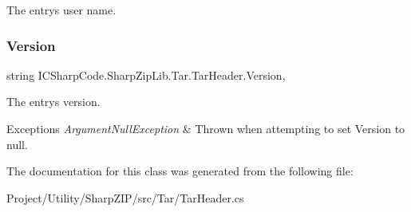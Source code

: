 The entry\textquotesingle{}s user name. 

\mbox{\label{class_i_c_sharp_code_1_1_sharp_zip_lib_1_1_tar_1_1_tar_header_a1c4dc61a04e28e9073cfea713e130d0c}} 
\subsubsection{\texorpdfstring{Version}{Version}}
{\footnotesize\ttfamily string I\+C\+Sharp\+Code.\+Sharp\+Zip\+Lib.\+Tar.\+Tar\+Header.\+Version\hspace{0.3cm}{\ttfamily [get]}, {\ttfamily [set]}}



The entry\textquotesingle{}s version. 


\begin{DoxyExceptions}{Exceptions}
{\em Argument\+Null\+Exception} & Thrown when attempting to set Version to null.\\
\hline
\end{DoxyExceptions}


The documentation for this class was generated from the following file\+:\begin{DoxyCompactItemize}
\item 
Project/\+Utility/\+Sharp\+Z\+I\+P/src/\+Tar/Tar\+Header.\+cs\end{DoxyCompactItemize}

